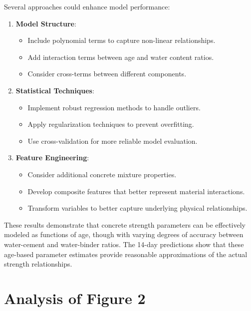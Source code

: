 \documentclass[a4paper,11pt]{article}
\begin{document}
Several approaches could enhance model performance:

\begin{enumerate}
    \item \textbf{Model Structure}:
    \begin{itemize}
        \item Include polynomial terms to capture non-linear relationships.
        \item Add interaction terms between age and water content ratios.
        \item Consider cross-terms between different components.
    \end{itemize}

    \item \textbf{Statistical Techniques}:
    \begin{itemize}
        \item Implement robust regression methods to handle outliers.
        \item Apply regularization techniques to prevent overfitting.
        \item Use cross-validation for more reliable model evaluation.
    \end{itemize}

    \item \textbf{Feature Engineering}:
    \begin{itemize}
        \item Consider additional concrete mixture properties.
        \item Develop composite features that better represent material interactions.
        \item Transform variables to better capture underlying physical relationships.
    \end{itemize}
\end{enumerate}
 

 
These results demonstrate that concrete strength parameters can be effectively modeled as functions of age, though with varying degrees of accuracy between water-cement and water-binder ratios. The 14-day predictions show that these age-based parameter estimates provide reasonable approximations of the actual strength relationships.
\section*{Analysis of Figure 2}
\end{document}
